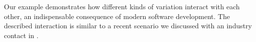 
Our example demonstrates how different kinds of variation
interact with each other, an indispensable consequence of modern software
development.
The described interaction is similar to a recent scenario we discussed with an
industry contact in .

